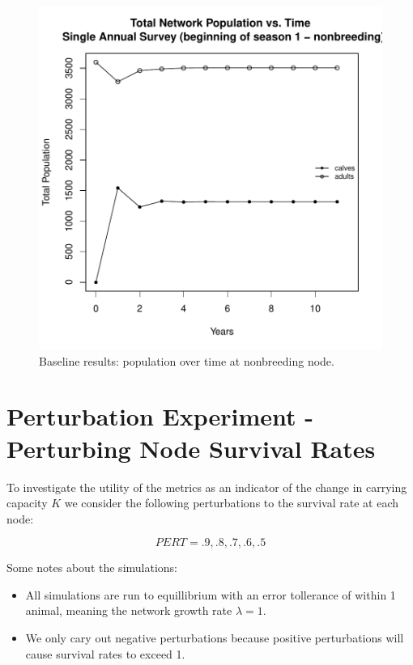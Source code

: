 \documentclass[10pt]{article}
\begin{document}
\begin{figure}[H]
\begin{center}
\includegraphics[width=.7\textwidth, height=.6\textwidth]{RGraphics-elkbaseline}
\caption{Baseline results: population over time at nonbreeding node.}\label{fig:elkbaseline}
\end{center}
\end{figure}

\clearpage


\section{Perturbation Experiment - Perturbing Node Survival Rates}

To investigate the utility of the metrics as an indicator of the change in carrying capacity $K$ we consider the following perturbations to the survival rate at each node:

\[PERT = .9, .8, .7, .6, .5\]

Some notes about the simulations:
\begin{itemize}
\item All simulations are run to equillibrium with an error tollerance of within 1 animal, meaning the network growth rate $\lambda=1$.
\item We only cary out negative perturbations because positive perturbations will cause survival rates to exceed 1.
\end{itemize}
%  


\newpage 
\end{document}
